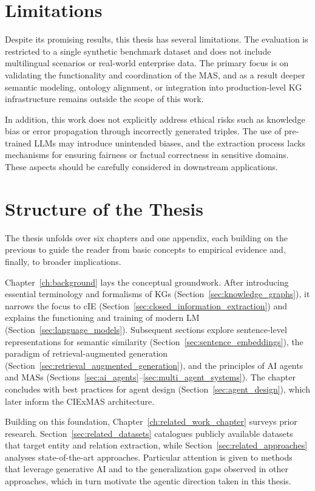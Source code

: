 \documentclass[a4paper,oneside,bibliography=totoc]{scrbook}
\begin{document}
\section{Limitations}
\label{sec:limitations}

Despite its promising results, this thesis has several limitations. The evaluation is restricted to a single synthetic benchmark dataset and does not include multilingual scenarios or real-world enterprise data. The primary focus is on validating the functionality and coordination of the \ac{MAS}, and as a result deeper semantic modeling, ontology alignment, or integration into production-level \ac{KG} infrastructure remains outside the scope of this work.

In addition, this work does not explicitly address ethical risks such as knowledge bias or error propagation through incorrectly generated triples. The use of pre-trained \acp{LLM} may introduce unintended biases, and the extraction process lacks mechanisms for ensuring fairness or factual correctness in sensitive domains. These aspects should be carefully considered in downstream applications.

\section{Structure of the Thesis}
\label{sec:structure}

The thesis unfolds over six chapters and one appendix, each building on the previous to guide the reader from basic concepts to empirical evidence and, finally, to broader implications.

Chapter~\ref{ch:background} lays the conceptual groundwork. After introducing essential terminology and formalisms of \acp{KG} (Section~\ref{sec:knowledge_graphs}), it narrows the focus to \ac{cIE} (Section~\ref{sec:closed_information_extraction}) and explains the functioning and training of modern \ac{LM} (Section~\ref{sec:language_models}). Subsequent sections explore sentence-level representations for semantic similarity (Section~\ref{sec:sentence_embeddings}), the paradigm of retrieval-augmented generation (Section~\ref{sec:retrieval_augmented_generation}), and the principles of AI agents and \acp{MAS} (Sections~\ref{sec:ai_agents}–\ref{sec:multi_agent_systems}). The chapter concludes with best practices for agent design (Section~\ref{sec:agent_design}), which later inform the CIExMAS architecture.

Building on this foundation, Chapter~\ref{ch:related_work_chapter} surveys prior research. Section~\ref{sec:related_datasets} catalogues publicly available datasets that target entity and relation extraction, while Section~\ref{sec:related_approaches} analyses state-of-the-art approaches. Particular attention is given to methods that leverage generative AI and to the generalization gaps observed in other approaches, which in turn motivate the agentic direction taken in this thesis.
\end{document}
